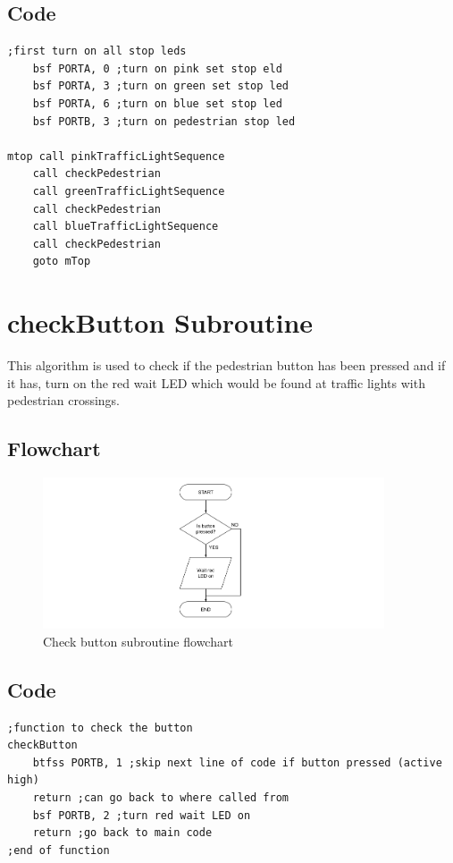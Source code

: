\subsection*{Code}
\begin{lstlisting}[language={[x86masm]Assembler}, style=assembly, caption=Main sequence code]
;first turn on all stop leds
	bsf PORTA, 0 ;turn on pink set stop eld
	bsf PORTA, 3 ;turn on green set stop led
	bsf PORTA, 6 ;turn on blue set stop led
	bsf PORTB, 3 ;turn on pedestrian stop led

mtop call pinkTrafficLightSequence
	call checkPedestrian
	call greenTrafficLightSequence
	call checkPedestrian
	call blueTrafficLightSequence
	call checkPedestrian
	goto mTop
\end{lstlisting}

\section{checkButton Subroutine}
This algorithm is used to check if the pedestrian button has been pressed and if it has, turn on the red wait LED which would be found at traffic lights with pedestrian crossings.

\subsection*{Flowchart}
\begin{figure}[H]
    \centering
    \includegraphics[width=0.9\textwidth]{images/flowchart-checkButton.png}
    \caption{Check button subroutine flowchart}
    \label{fig:flowchart-checkButton}
\end{figure}
\subsection*{Code}
\begin{lstlisting}[language={[x86masm]Assembler}, style=assembly, caption=checkButton subroutine]
;function to check the button
checkButton
	btfss PORTB, 1 ;skip next line of code if button pressed (active high)
	return ;can go back to where called from
	bsf PORTB, 2 ;turn red wait LED on
	return ;go back to main code
;end of function
\end{lstlisting}

